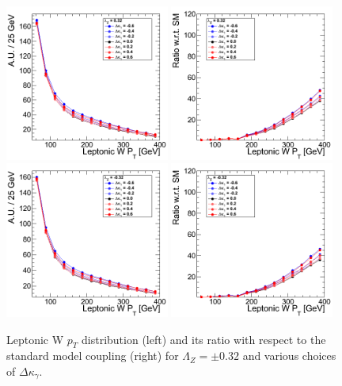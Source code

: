 \begin{figure}[h!t]
  {\centering
    \includegraphics[width=0.48\textwidth]{figs/LeptonicWpT_032.png}
    \includegraphics[width=0.48\textwidth]{figs/LeptonicWpT_032_ratio.png}
    \includegraphics[width=0.48\textwidth]{figs/LeptonicWpT_m032.png}
    \includegraphics[width=0.48\textwidth]{figs/LeptonicWpT_m032_ratio.png}
    \caption{Leptonic W $p_T$ distribution (left) and its ratio with respect to 
    the standard model coupling (right) for $\Lambda_Z = \pm 0.32$ and various choices of $\Delta{\kappa_\gamma}$.}
    \label{fig:ww_LeptonicWpT_atgcRatio032}}
\end{figure}
